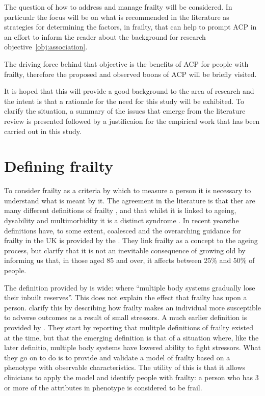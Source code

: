 \documentclass
[
	12pt,
	a4paper,
	oneside,
]{report}
\begin{document}
The question of how to address and manage frailty will be considered. In 
particualr the focus will be on what is recommended in the literature as 
strategies for determining the factors, in frailty, that can help to prompt
ACP in an effort to inform the reader about the background for research 
objective~\ref{obj:association}.

The driving force behind that objective is the benefits of ACP for people with 
frailty, therefore the proposed and observed boons of ACP will be briefly 
visited.

It is hoped that this will provide a good background to the area of research
and the intent is that a rationale for the need for this study will be 
exhibited. To clarify the situation, a summary of the issues that emerge from
the literature review is presented followed by a justificaion for the
empirical work that has been carried out in this study.

\section{Defining frailty}

To consider frailty as a criteria by which to measure a person it is necessary
to understand what is meant by it. The agreement in the literature is that ther
are many different definitions of frailty
\parencite{ensrud:08,rockwood:05,conroy:09}, and that whilst it is linked to
ageing, dysability and multimorbidity it is a distinct syndrome
\parencite{fried:01,conroy:09}. In recent yearsthe definitions have, to some
extent, coalesced and the overarching guidance for frailty in the 
UK is provided by the \textcite{bgs:14}. They link frailty as a concept to the 
ageing process, but clarify that it is not an inevitable consequence of growing
old by informing us that, in those aged 85 and over, it affects between 25\% 
and 50\% of people. 

The definition provided by \textcite{bgs:14} is wide: where ``multiple body 
systems gradually lose
their inbuilt reserves''. This does not explain the effect that frailty has upon
a person. \textcite{clegg:13} clarify this by describing how frailty makes an
individual more susceptible to adverse outcomes as a result of small stressors.
A much earlier definition is provided by \textcite{fried:01}. They
start by reporting that mulitple definitions of frailty existed at the time, 
but that the emerging definition is that of a situation where, like the later
definitio, multiple body systems have lowered ability to fight stressors. What
they go on to do is to provide and validate a model of frailty based on a phenotype
with observable characteristics. The utility of this is that it allows 
clinicians to apply the model and identify people with frailty: a person who has
3 or more of the attributes in phenotype is considered to be frail. 
\end{document}
